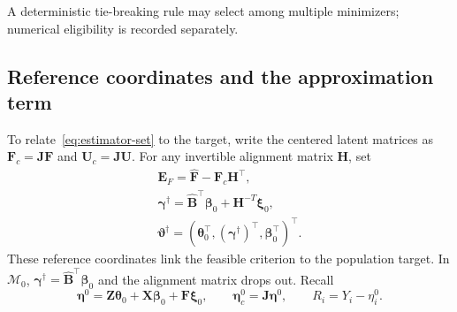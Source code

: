 A deterministic tie-breaking rule may select among multiple minimizers; numerical eligibility is recorded separately.

\subsection{Reference coordinates and the approximation term}
\label{subsec:reference-coordinates}
To relate~\eqref{eq:estimator-set} to the target, write the centered latent matrices as $\bm{F}_c=\bm{J}\bm{F}$ and $\bm{U}_c=\bm{J}\bm{U}$. For any invertible alignment matrix $\bm{H}$, set
\begin{equation}
 \begin{gathered}
\bm{E}_F=\widehat{\bm{F}}-\bm{F}_c\bm{H}^\top,\\
 \bm{\gamma}^\dagger=\widehat{\bm{B}}^\top\bm{\beta}_0+\bm{H}^{-T}\bm{\xi}_0,\\
 \bm{\vartheta}^\dagger=(\bm{\theta}_0^\top,(\bm{\gamma}^\dagger)^\top,\bm{\beta}_0^\top)^\top.
 \end{gathered}
 \label{eq:reference-parameter}
\end{equation}
These reference coordinates link the feasible criterion to the population target. In $\mathcal M_0$, $\bm{\gamma}^\dagger=\widehat{\bm{B}}^\top\bm{\beta}_0$ and the alignment matrix drops out. Recall
\[
 \bm{\eta}^0=\bm{Z}\bm{\theta}_0+\bm{X}\bm{\beta}_0+\bm{F}\bm{\xi}_0,\qquad
 \bm{\eta}_c^0=\bm{J}\bm{\eta}^0,\qquad
 R_i=Y_i-\eta_i^0.
\]

